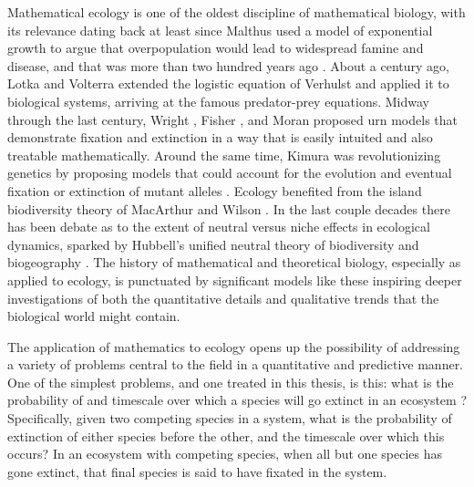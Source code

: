 Mathematical ecology is one of the oldest discipline of mathematical biology, with its relevance dating back at least since Malthus used a model of exponential growth to argue that overpopulation would lead to widespread famine and disease, and that was more than two hundred years ago \cite{Malthus1798}. 
About a century ago, Lotka \cite{Lotka1920} and Volterra \cite{Volterra1926} extended the logistic equation of Verhulst \cite{Verhulst1838} and applied it to biological systems, arriving at the famous predator-prey equations. 
Midway through the last century, Wright \cite{Wright1931}, Fisher \cite{Fisher1930}, and Moran \cite{Moran1962} proposed urn models that demonstrate fixation and extinction in a way that is easily intuited and also treatable mathematically. 
Around the same time, Kimura was revolutionizing genetics by proposing models that could account for the evolution and eventual fixation or extinction of mutant alleles \cite{Crow1956,Kimura1964}. 
Ecology benefited from the island biodiversity theory of MacArthur and Wilson \cite{MacArthur1967}. %
In the last couple decades there has been debate as to the extent of neutral versus niche effects in ecological dynamics, sparked by Hubbell's unified neutral theory of biodiversity and biogeography \cite{Hubbell2001}. 
The history of mathematical and theoretical biology, especially as applied to ecology, is punctuated by significant models like these inspiring deeper investigations of both the quantitative details and qualitative trends that the biological world might contain. 

The application of mathematics to ecology opens up the possibility of addressing a variety of problems central to the field in a quantitative and predictive manner. 
One of the simplest problems, and one treated in this thesis, is this: what is the probability of and timescale over which a species will go extinct in an ecosystem \cite{Badali2019a,Badali2019b}? 
Specifically, given two competing species in a system, what is the probability of extinction of either species before the other, and the timescale over which this occurs? 
In an ecosystem with competing species, when all but one species has gone extinct, that final species is said to have fixated in the system. 

